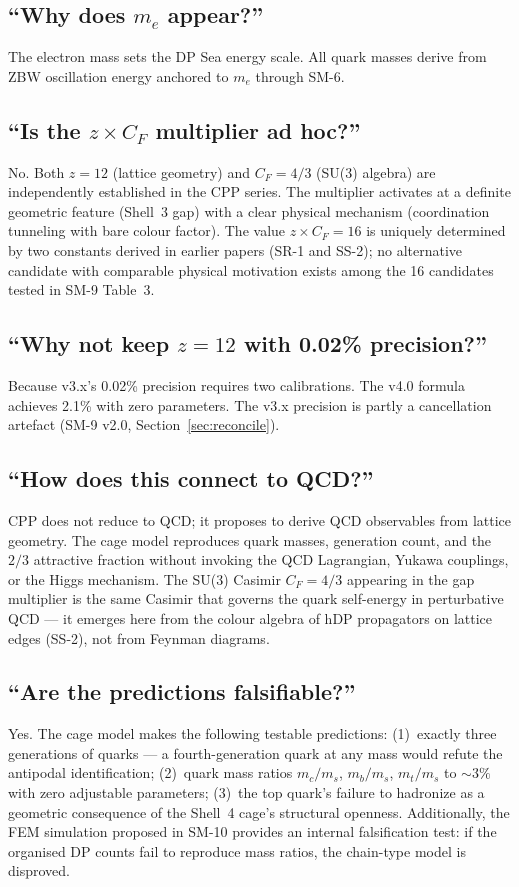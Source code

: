 \documentclass[11pt,letterpaper]{article}
\begin{document}
\subsection{``Why does $m_e$ appear?''}
The electron mass sets the DP Sea energy scale.  All quark masses
derive from ZBW oscillation energy anchored to $m_e$ through SM-6.

\subsection{``Is the $z \times C_F$ multiplier ad hoc?''}
No.  Both $z = 12$ (lattice geometry) and $C_F = 4/3$ (SU(3)
algebra) are independently established in the CPP series.  The
multiplier activates at a definite geometric feature (Shell~3 gap)
with a clear physical mechanism (coordination tunneling with bare
colour factor).  The value $z \times C_F = 16$ is uniquely
determined by two constants derived in earlier papers (SR-1 and
SS-2); no alternative candidate with comparable physical motivation
exists among the 16 candidates tested in SM-9 Table~3.

\subsection{``Why not keep $z = 12$ with 0.02\% precision?''}
Because v3.x's 0.02\% precision requires two calibrations.  The
v4.0 formula achieves 2.1\% with zero parameters.  The v3.x
precision is partly a cancellation artefact (SM-9 v2.0,
Section~\ref{sec:reconcile}).

\subsection{``How does this connect to QCD?''}
CPP does not reduce to QCD; it proposes to derive QCD observables
from lattice geometry.  The cage model reproduces quark masses,
generation count, and the $2/3$ attractive fraction without
invoking the QCD Lagrangian, Yukawa couplings, or the Higgs
mechanism.  The SU(3) Casimir $C_F = 4/3$ appearing in the gap
multiplier is the same Casimir that governs the quark self-energy
in perturbative QCD --- it emerges here from the colour algebra of
hDP propagators on lattice edges (SS-2), not from Feynman diagrams.

\subsection{``Are the predictions falsifiable?''}
Yes.  The cage model makes the following testable predictions:
(1)~exactly three generations of quarks --- a fourth-generation
quark at any mass would refute the antipodal identification;
(2)~quark mass ratios $m_c/m_s$, $m_b/m_s$, $m_t/m_s$ to
$\sim 3\%$ with zero adjustable parameters;
(3)~the top quark's failure to hadronize as a geometric
consequence of the Shell~4 cage's structural openness.
Additionally, the FEM simulation proposed in SM-10 provides an
internal falsification test: if the organised DP counts fail to
reproduce mass ratios, the chain-type model is disproved.
\end{document}
